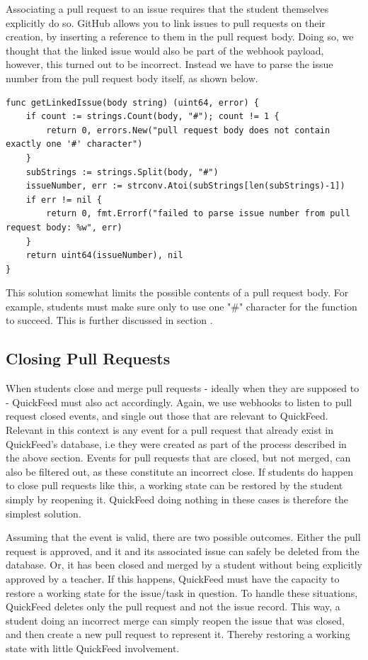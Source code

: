 Associating a pull request to an issue requires that the student themselves explicitly do so.
GitHub allows you to link issues to pull requests on their creation, by inserting a reference to them in the pull request body.
Doing so, we thought that the linked issue would also be part of the webhook payload, however, this turned out to be incorrect.
Instead we have to parse the issue number from the pull request body itself, as shown below.
\begin{lstlisting}[caption={The getLinkedIssue function}, language=Golang]
func getLinkedIssue(body string) (uint64, error) {
	if count := strings.Count(body, "#"); count != 1 {
		return 0, errors.New("pull request body does not contain exactly one '#' character")
	}
	subStrings := strings.Split(body, "#")
	issueNumber, err := strconv.Atoi(subStrings[len(subStrings)-1])
	if err != nil {
		return 0, fmt.Errorf("failed to parse issue number from pull request body: %w", err)
	}
	return uint64(issueNumber), nil
}
\end{lstlisting}

This solution somewhat limits the possible contents of a pull request body.
For example, students must make sure only to use one "\#" character for the function to succeed.
This is further discussed in section .%

\subsection{Closing Pull Requests}

When students close and merge pull requests - ideally when they are supposed to - QuickFeed must also act accordingly.
Again, we use webhooks to listen to pull request closed events, and single out those that are relevant to QuickFeed.
Relevant in this context is any event for a pull request that already exist in QuickFeed's database, i.e they were created as part of the process described in the above section.
Events for pull requests that are closed, but not merged, can also be filtered out, as these constitute an incorrect close.
If students do happen to close pull requests like this, a working state can be restored by the student simply by reopening it.
QuickFeed doing nothing in these cases is therefore the simplest solution.

Assuming that the event is valid, there are two possible outcomes.
Either the pull request is approved, and it and its associated issue can safely be deleted from the database.
Or, it has been closed and merged by a student without being explicitly approved by a teacher.
If this happens, QuickFeed must have the capacity to restore a working state for the issue/task in question.
To handle these situations, QuickFeed deletes only the pull request and not the issue record.
This way, a student doing an incorrect merge can simply reopen the issue that was closed, and then create a new pull request to represent it.
Thereby restoring a working state with little QuickFeed involvement.

